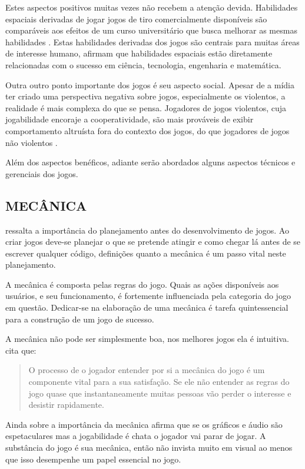 Estes aspectos positivos muitas vezes não recebem a atenção devida.
Habilidades espaciais derivadas de jogar jogos de tiro comercialmente
disponíveis são comparáveis aos efeitos de um curso universitário
que busca melhorar as mesmas habilidades \autocite{gamebenefits}. Estas
habilidades derivadas dos jogos são centrais para muitas áreas de
interesse humano, \cite{gamebenefits} afirmam que habilidades espaciais
estão diretamente relacionadas com o sucesso em ciência, tecnologia,
engenharia e matemática.

Outra outro ponto importante dos jogos é seu aspecto social. Apesar de a
mídia ter criado uma perspectiva negativa sobre jogos, especialmente
os violentos, a realidade é mais complexa do que se pensa. Jogadores
de jogos violentos, cuja jogabilidade encoraje a cooperatividade, são
mais prováveis de exibir comportamento altruísta fora do contexto dos
jogos, do que jogadores de jogos não violentos \autocite{gamebenefits}.

Além dos aspectos benéficos, adiante serão abordados alguns aspectos
técnicos e gerenciais dos jogos.

\subsection{MECÂNICA}

\cite{html5mostwanted} ressalta a importância do planejamento antes do
desenvolvimento de jogos. Ao criar jogos deve-se planejar o que se
pretende atingir e como chegar lá antes de se escrever qualquer
código, definições quanto a mecânica é um passo vital neste planejamento.

A mecânica é composta pelas regras do jogo. Quais as ações
disponíveis aos usuários, e seu funcionamento, é fortemente
influenciada pela categoria do jogo em questão. Dedicar-se na
elaboração de uma mecânica é tarefa quintessencial para a
construção de um jogo de sucesso.

A mecânica não pode ser simplesmente boa, nos melhores jogos ela é
intuitiva. \cite{crossPlatformMobileGame} cita que:
\begin{quote}
O processo de o jogador entender por si a mecânica do jogo é um
componente vital para a sua satisfação. Se ele não entender as
regras do jogo quase que instantaneamente muitas pessoas vão perder o
interesse e desistir rapidamente.
\end{quote}

Ainda sobre a importância da mecânica \cite{html5mostwanted} afirma
que se os gráficos e áudio são espetaculares mas a jogabilidade
é chata o jogador vai parar de jogar. A substância do jogo é sua
mecânica, então não invista muito em visual ao menos que isso
desempenhe um papel essencial no jogo.

